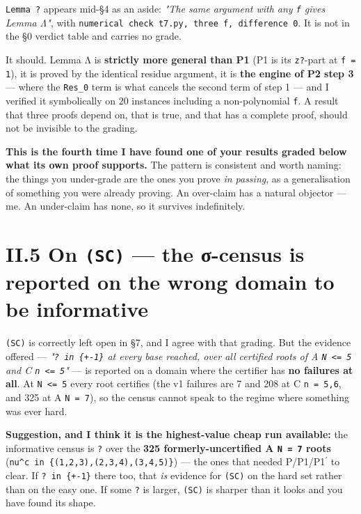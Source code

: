 \documentclass[11pt,a4paper]{article}
\begin{document}
\mbox{\texttt{Lemma ?}} appears mid-\S{}4 as an aside: \emph{"The same argument with any \mbox{\texttt{f}} gives Lemma Λ"}, with \mbox{\texttt{numerical check t7.py, three f, difference 0}}. It is not in the \S{}0 verdict table and carries no grade.

It should. Lemma Λ is \textbf{strictly more general than P1} (P1 is its \mbox{\texttt{z?}}-part at \mbox{\texttt{f = 1}}), it is proved by the identical residue argument, it is \textbf{the engine of P2 step 3} --- where the \mbox{\texttt{Res\_0}} term is what cancels the second term of step 1 --- and I verified it symbolically on 20 instances including a non-polynomial \mbox{\texttt{f}}. A result that three proofs depend on, that is true, and that has a complete proof, should not be invisible to the grading.

\textbf{This is the fourth time I have found one of your results graded below what its own proof supports.} The pattern is consistent and worth naming: the things you under-grade are the ones you prove \emph{in passing}, as a generalisation of something you were already proving. An over-claim has a natural objector --- me. An under-claim has none, so it survives indefinitely.

\section*{II.5 On \mbox{\texttt{(SC)}} --- the σ-census is reported on the wrong domain to be informative}

\mbox{\texttt{(SC)}} is correctly left open in \S{}7, and I agree with that grading. But the evidence offered --- \emph{"\mbox{\texttt{? in \{+-1\}}} at every base reached, over all certified roots of A \mbox{\texttt{N <= 5}} and C \mbox{\texttt{n <= 5}}"} --- is reported on a domain where the certifier has \textbf{no failures at all}. At \mbox{\texttt{N <= 5}} every root certifies (the v1 failures are 7 and 208 at C \mbox{\texttt{n = 5,6}}, and 325 at A \mbox{\texttt{N = 7}}), so the census cannot speak to the regime where something was ever hard.

\textbf{Suggestion, and I think it is the highest-value cheap run available:} the informative census is \mbox{\texttt{?}} over the \textbf{325 formerly-uncertified A \mbox{\texttt{N = 7}} roots} (\mbox{\texttt{nu\textasciicircum{}c in \{(1,2,3),(2,3,4),(3,4,5)\}}}) --- the ones that needed P/P1/P1$^{\prime}$ to clear. If \mbox{\texttt{? in \{+-1\}}} there too, that \emph{is} evidence for \mbox{\texttt{(SC)}} on the hard set rather than on the easy one. If some \mbox{\texttt{?}} is larger, \mbox{\texttt{(SC)}} is sharper than it looks and you have found its shape.
\end{document}
